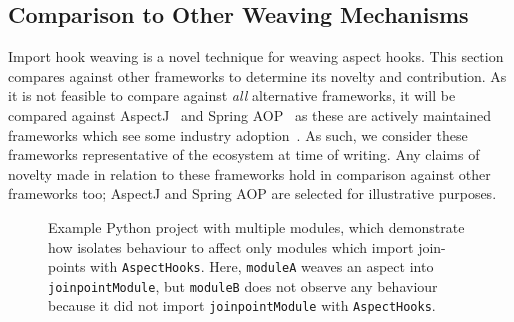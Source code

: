 \subsection{Comparison to Other Weaving Mechanisms}

Import hook weaving is a novel technique for weaving aspect hooks. This section
compares \pdsfthree against other \aop frameworks to determine its novelty and
contribution. As it is not feasible to compare \pdsfthree against \emph{all}
alternative \aop frameworks, it will be compared against
AspectJ~\cite{AspectJLanguageAndTools} and Spring
AOP~\cite{springAOPDocumentation} as these are actively maintained \aop
frameworks which see some industry adoption~\cite{przybylek2018empirical}. As
such, we consider these frameworks representative of the \aop ecosystem at time
of writing. Any claims of novelty made in relation to these frameworks hold in
comparison against other frameworks too; AspectJ and Spring AOP are selected for
illustrative purposes.

\begin{figure}
    \centering
    
    
    
    
    
    \caption{Example Python project with multiple modules, which demonstrate how
    \pdsfthree isolates \aspectoriented behaviour to affect only modules which
    import join-points with \lstinline{AspectHooks}. Here, \lstinline{moduleA}
    weaves an aspect into \lstinline{joinpointModule}, but \lstinline{moduleB}
    does not observe any \aspectoriented behaviour because it did not import
    \lstinline{joinpointModule} with \lstinline{AspectHooks}.}
    \label{fig:isolated_aspect_hook_weaving_illustration}
\end{figure}

